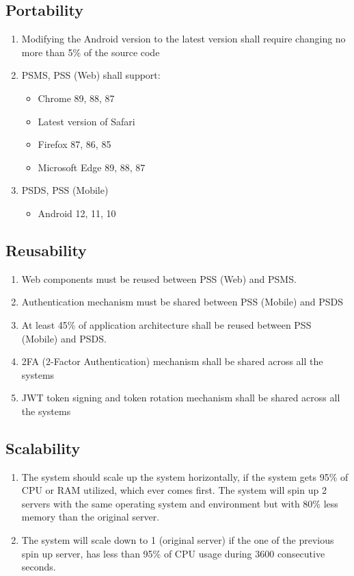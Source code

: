 \subsection{Portability}
\begin{enumerate}[label=SEC-\arabic*]
    \item Modifying the Android version to the latest version shall require 
    changing no more than 5\% of the source code
    \item PSMS, PSS (Web) shall support:
    \begin{itemize}
        \item Chrome 89, 88, 87
        \item Latest version of Safari
        \item Firefox 87, 86, 85
        \item Microsoft Edge 89, 88, 87
    \end{itemize}
    \item PSDS, PSS (Mobile)
    \begin{itemize}
        \item Android 12, 11, 10
    \end{itemize}
\end{enumerate}

\subsection{Reusability}
\begin{enumerate}[label=SEC-\arabic*]
    \item Web components must be reused between PSS (Web) and PSMS.
    \item Authentication mechanism must be shared between PSS (Mobile) and PSDS
    \item At least 45\% of application architecture shall be reused 
    between PSS (Mobile) and PSDS.
    \item 2FA (2-Factor Authentication) mechanism shall be shared across 
    all the systems
    \item JWT token signing and token rotation mechanism shall be shared 
    across all the systems
\end{enumerate}

\subsection{Scalability}
\begin{enumerate}[label=SEC-\arabic*]
    \item The system should scale up the system horizontally, if the system 
    gets 95\% of CPU or RAM utilized, which ever comes first. The system will 
    spin up 2 servers with the same operating system and environment 
    but with 80\% less memory than the original server.
    \item The system will scale down to 1 (original server) if the one of the 
    previous spin up server, has less than 95\% of CPU usage during 3600 
    consecutive seconds.
\end{enumerate}

